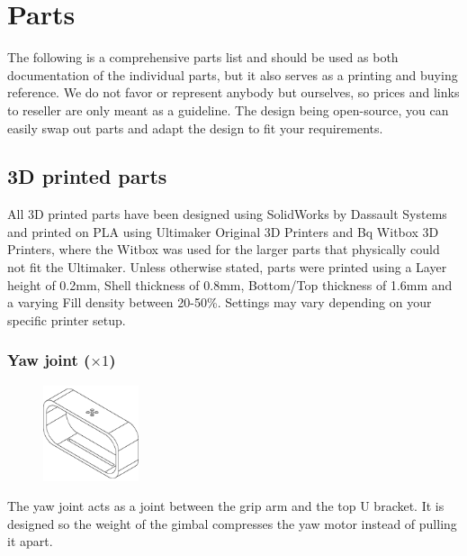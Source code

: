 \chapter{Parts}
The following is a comprehensive parts list and should be used as both documentation of the individual parts, but it also serves as a printing and buying reference. We do not favor or represent anybody but ourselves, so prices and links to reseller are only meant as a guideline. The design being open-source, you can easily swap out parts and adapt the design to fit your requirements.



\section{3D printed parts}

All 3D printed parts have been designed using SolidWorks by Dassault Systems and printed on PLA using Ultimaker Original 3D Printers and Bq Witbox 3D Printers, where the Witbox was used for the larger parts that physically could not fit the Ultimaker. Unless otherwise stated, parts were printed using a Layer height of 0.2mm, Shell thickness of 0.8mm, Bottom/Top thickness of 1.6mm and a varying Fill density between 20-50\%. Settings may vary depending on your specific printer setup.

\subsection{Yaw joint ($\times1$)}

\begin{figure}
    \vspace{-1.5cm}
    \includegraphics[width=0.25\textwidth]{PrintedParts/yaw_joint.PNG}
\end{figure}

The yaw joint acts as a joint between the grip arm and the top U bracket. It is designed so the weight of the gimbal compresses the yaw motor instead of pulling it apart.\\


